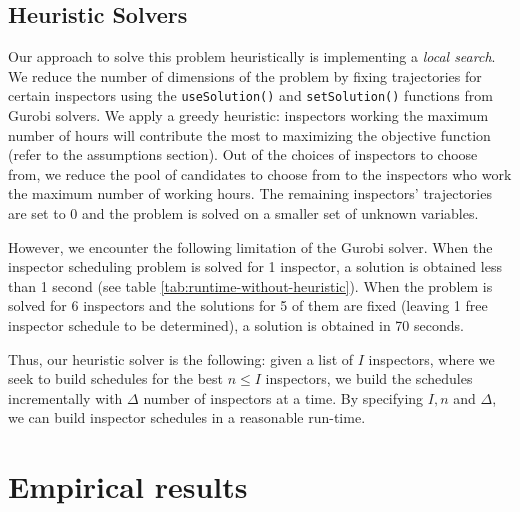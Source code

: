 \documentclass[11pt]{article}
\begin{document}
\subsection{Heuristic Solvers}
\par Our approach to solve this problem heuristically is implementing a \textit{local search}. We reduce the number of dimensions of the problem by fixing trajectories for certain inspectors using the \texttt{useSolution()} and \texttt{setSolution()} functions from Gurobi solvers. We apply a greedy heuristic: inspectors working the maximum number of hours will contribute the most to maximizing the objective function (refer to the assumptions section). Out of the choices of inspectors to choose from, we reduce the pool of candidates to choose from to the inspectors who work the maximum number of working hours. The remaining inspectors' trajectories are set to $0$ and the problem is solved on a smaller set of unknown variables.
\par However, we encounter the following limitation of the Gurobi solver. When the inspector scheduling problem is solved for 1 inspector, a solution is obtained less than 1 second (see table \ref{tab:runtime-without-heuristic}). When the problem is solved for 6 inspectors and the solutions for 5 of them are fixed (leaving 1 free inspector schedule to be determined), a solution is obtained in 70 seconds.
\par Thus, our heuristic solver is the following: given a list of $I$ inspectors, where we seek to build schedules for the best $n\le I$ inspectors, we build the schedules incrementally with $\Delta$ number of inspectors at a time. By specifying $I, n$ and $\Delta$, we can build inspector schedules in a reasonable run-time. 



\section{Empirical results}
\end{document}
